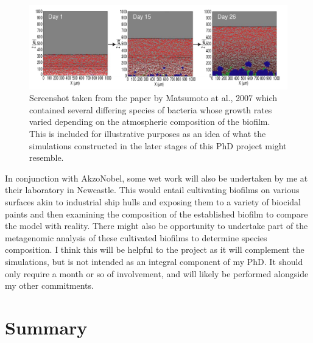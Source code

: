 \documentclass[a4paper,12pt]{article}
\begin{document}
\begin{figure}[H]
 \centering
 \includegraphics[width=\textwidth]{Matsumoto-biofilm-simulation}
 \caption{Screenshot taken from the paper by Matsumoto at al., 2007 \cite{bioref:Matsumoto-sim-snapshot-2007} which contained several differing species of bacteria whose growth rates 
 varied depending on the atmospheric composition of the biofilm.  This is included for illustrative purposes as an idea of what the simulations constructed in the later 
 stages of this PhD project might resemble.}
 \label{fig:Matsumoto-sim-snapshot}
\end{figure}

In conjunction with AkzoNobel, some wet work will also be undertaken by me at their laboratory in Newcastle.  This would entail cultivating biofilms on various surfaces akin to industrial 
ship hulls and exposing them to a variety of biocidal paints and then examining the composition of the established biofilm to compare the model with reality.  There might also 
be opportunity to undertake part of the metagenomic analysis of these cultivated biofilms to determine species composition.  I think this will be helpful to the project as it will 
complement the simulations, but is not intended as an integral component of my PhD.  It should only require a month or so of involvement, and will likely be performed alongside my 
other commitments. 

% 
% 
 
\section{Summary}
\end{document}
